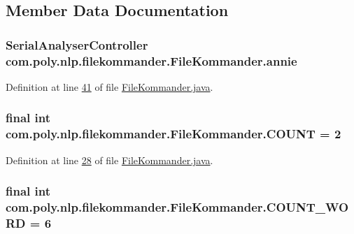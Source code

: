 \subsection{Member Data Documentation}
\hypertarget{classcom_1_1poly_1_1nlp_1_1filekommander_1_1_file_kommander_a5c3ff51dc7f068e9442618b7c2ab1810}{
\subsubsection[{annie}]{\setlength{\rightskip}{0pt plus 5cm}Serial\-Analyser\-Controller com.\-poly.\-nlp.\-filekommander.\-File\-Kommander.\-annie\hspace{0.3cm}{\ttfamily [private]}}}\label{classcom_1_1poly_1_1nlp_1_1filekommander_1_1_file_kommander_a5c3ff51dc7f068e9442618b7c2ab1810}


Definition at line \hyperlink{L41}{41} of file \hyperlink{}{File\-Kommander.\-java}.

\hypertarget{classcom_1_1poly_1_1nlp_1_1filekommander_1_1_file_kommander_ae3f898b3eba16a0ea7fde82bc1bb8352}{
\subsubsection[{C\-O\-U\-N\-T}]{\setlength{\rightskip}{0pt plus 5cm}final int com.\-poly.\-nlp.\-filekommander.\-File\-Kommander.\-C\-O\-U\-N\-T = 2\hspace{0.3cm}{\ttfamily [static]}}}\label{classcom_1_1poly_1_1nlp_1_1filekommander_1_1_file_kommander_ae3f898b3eba16a0ea7fde82bc1bb8352}


Definition at line \hyperlink{L28}{28} of file \hyperlink{}{File\-Kommander.\-java}.

\hypertarget{classcom_1_1poly_1_1nlp_1_1filekommander_1_1_file_kommander_a1c18ad75cdd0b8963695c1a8fd378b9c}{
\subsubsection[{C\-O\-U\-N\-T\-\_\-\-W\-O\-R\-D}]{\setlength{\rightskip}{0pt plus 5cm}final int com.\-poly.\-nlp.\-filekommander.\-File\-Kommander.\-C\-O\-U\-N\-T\-\_\-\-W\-O\-R\-D = 6\hspace{0.3cm}{\ttfamily [static]}}}\label{classcom_1_1poly_1_1nlp_1_1filekommander_1_1_file_kommander_a1c18ad75cdd0b8963695c1a8fd378b9c}


